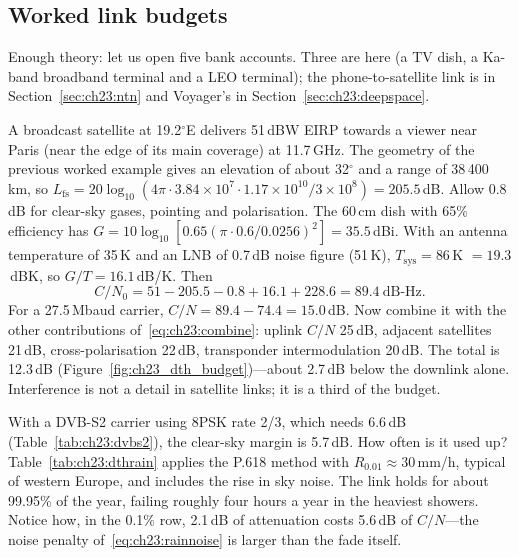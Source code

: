 \subsection{Worked link budgets}

Enough theory: let us open five bank accounts. Three are here (a TV dish, a Ka-band broadband
terminal and a LEO terminal); the phone-to-satellite link is in Section~\ref{sec:ch23:ntn} and
Voyager's in Section~\ref{sec:ch23:deepspace}.


\begin{worked}
A broadcast satellite at 19.2$^\circ$E delivers 51\,dBW EIRP towards a viewer near Paris
(near the edge of its main coverage) at 11.7\,GHz. The geometry of the previous worked
example gives an elevation of about 32$^\circ$ and a range of 38\,400\,km, so
$L_{\text{fs}}=20\log_{10}(4\pi\cdot3.84\times10^7\cdot1.17\times10^{10}/3\times10^8)=205.5$\,dB.
Allow 0.8\,dB for clear-sky gases, pointing and polarisation. The 60\,cm dish with 65\%
efficiency has $G=10\log_{10}[0.65(\pi\cdot0.6/0.0256)^2]=35.5$\,dBi. With an antenna temperature
of 35\,K and an LNB of 0.7\,dB noise figure (51\,K), $T_{\text{sys}}=86$\,K $=19.3$\,dBK, so
$G/T=16.1$\,dB/K. Then
\[
C/N_0=51-205.5-0.8+16.1+228.6=89.4\ \text{dB-Hz}.
\]
For a 27.5\,Mbaud carrier, $C/N=89.4-74.4=15.0$\,dB. Now combine it with the other contributions
of~\eqref{eq:ch23:combine}: uplink $C/N$ 25\,dB, adjacent satellites 21\,dB, cross-polarisation
22\,dB, transponder intermodulation 20\,dB. The total is 12.3\,dB (Figure~\ref{fig:ch23_dth_budget})---about
2.7\,dB below the downlink alone. Interference is not a detail in satellite links; it is a third
of the budget.

With a DVB-S2 carrier using 8PSK rate 2/3, which needs 6.6\,dB (Table~\ref{tab:ch23:dvbs2}), the
clear-sky margin is 5.7\,dB. How often is it used up? Table~\ref{tab:ch23:dthrain} applies the
P.618 method with $R_{0.01}\approx30$\,mm/h, typical of western Europe, and includes the rise in
sky noise. The link holds for about 99.95\% of the year, failing roughly four hours a year in
the heaviest showers. Notice how, in the 0.1\% row, 2.1\,dB of attenuation costs 5.6\,dB of
$C/N$---the noise penalty of~\eqref{eq:ch23:rainnoise} is larger than the fade itself.
\end{worked}

